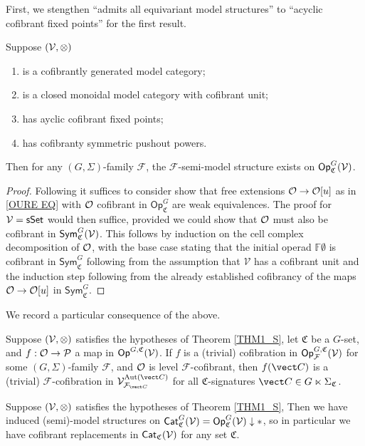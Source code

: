 \documentclass[a4paper,10pt
]{article}%
\renewcommand{\F}{\mathcal F}
\renewcommand{\1}{\eta}%
\begin{document}
First, we stengthen ``admits all equivariant model structures'' to ``acyclic cofibrant fixed points'' for the first result.
\begin{theorem}
	\label{THM1_S}
	Suppose $(\mathcal V,\otimes)$
	\begin{enumerate}[label = (\roman*)]
		\item is a cofibrantly generated model category;
		\item is a closed monoidal model category with cofibrant unit;
		\item has ayclic cofibrant fixed points;
		\item has cofibranty symmetric pushout powers.
	\end{enumerate}
	Then for any $(G, \Sigma)$-family $\F$,
	the $\F$-semi-model structure exists on $\mathsf{Op}^G_{\mathfrak C}(\mathcal V)$. 
\end{theorem}
\begin{proof}
	Following \cite[Thm. 2.2.2]{WY18} it suffices to consider show that free extensions $\mathcal{O} \to \mathcal{O}[u]$ as in \eqref{OURE EQ} with $\mathcal{O}$ cofibrant in $\mathsf{Op}^G_{\mathfrak C}$ are weak equivalences.
	The proof for $\mathcal V = \mathsf{sSet}$ would then suffice, provided we could show that $\mathcal{O}$ must also be cofibrant in $\mathsf{Sym}^G_{\mathfrak C}(\mathcal V)$.
	This follows by induction on the cell complex decomposition of $\mathcal{O}$,
	with the base case stating that the initial operad $\mathbb{F}\emptyset$ is cofibrant in $\mathsf{Sym}^G_{\mathfrak{C}}$
	following from the assumption that $\mathcal{V}$ has a cofibrant unit
	and the induction step following from the already established cofibrancy of the maps $\mathcal{O} \to \mathcal{O}[u]$ in $\mathsf{Sym}^G_{\mathfrak{C}}$.
\end{proof}

We record a particular consequence of the above.
\begin{corollary}
	\label{LGC_COR}
	Suppose $(\mathcal V, \otimes)$ satisfies the hypotheses of Theorem \ref{THM1_S},
	let $\mathfrak C$ be a $G$-set, and $f: \mathcal{O} \to \mathcal{P}$ a map in $\mathsf{Op}^{G,\mathfrak C}(\mathcal V)$.
	If $f$ is a (trivial) cofibration in $\Op^{G, \mathfrak C}_\F(\V)$ for some $(G, \Sigma)$-family $\F$,
	and $\mathcal{O}$ is level $\F$-cofibrant, then
	$f(\vect C)$ is a (trivial) $\F$-cofibration in $\V^{\Aut(\vect C)}_{\F_{\vect C}}$ for all $\mathfrak C$-signatures $\vect C \in G \ltimes \Sigma_{\mathfrak C}$.
\end{corollary}


\begin{corollary}
	\label{CATV_MC_COR}
	Suppose $(\mathcal V, \otimes)$ satisfies the hypotheses of Theorem \ref{THM1_S},
	Then we have induced (semi)-model structures on $\Cat^{G}_{ \mathfrak C}(\V) = \Op^{G}_{\mathfrak C}(\V) \downarrow \**$,
	so in particular we have cofibrant replacements in $\mathsf{Cat}_{\mathfrak C}(\mathcal V)$ for any set $\mathfrak C$.
\end{corollary}
\end{document}
